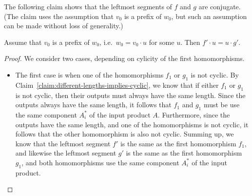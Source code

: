 The following claim shows that the leftmost segments of $f$ and $g$ are conjugate. (The claim uses the assumption that $v_0$ is a prefix of $w_0$, but such an assumption can be made without loss of generality.)
\begin{claim}\label{claim:first-segments-are-conjugate}
    Assume that  $v_0$ is a prefix of $w_0$, i.e.~$w_0 = v_0 \cdot  u$ for some  $u$. Then  $ f' \cdot u = u \cdot g'$.
\end{claim}
\begin{proof}
    We consider two cases, depending on cylicity of the  first homomorphisms.
    \begin{itemize}
        \item The first case is when one of the homomorphisms $f_1$ or $g_1$ is not cyclic.    By Claim~\ref{claim:different-lengths-implies-cyclic}, we know that if either $f_1$ or $g_1$ is not cyclic, then their  outputs must always have the same length. Since the outputs always have the same length, it follows that $f_1$ and $g_1$ must be use the same component $A^*_i$ of the input product $A$.  Furthermore, since the outputs have the same length, and one of the homomorphisms is not cyclic, it follows that the other homomorphism is also not cyclic. Summing up, we know that the leftmost segment $f'$ is the same as the first homomorphism $f_1$, and likewise the leftmost segment $g'$ is the same as the first homomorphism $g_1$,  and both homomorphisms use the same component $A^*_i$ of the input product.
        

\end{itemize}
\end{proof}
